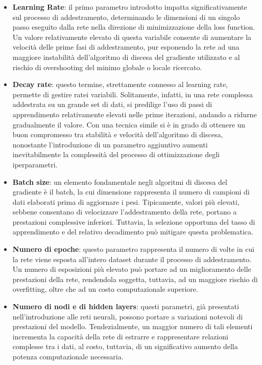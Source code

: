    \begin{itemize}

        \item \textbf{Learning Rate}: il primo parametro introdotto impatta significativamente sul processo di addestramento, determinando le dimensioni di un singolo passo eseguito dalla rete nella direzione di minimizzazione della loss function. Un valore relativamente elevato di questa variabile consente di aumentare la velocità delle prime fasi di addestramento, pur esponendo la rete ad una maggiore instabilità dell'algoritmo di discesa del gradiente utilizzato e al rischio di overshooting del minimo globale o locale ricercato.
        
        \item \textbf{Decay rate}: questo termine, strettamente connesso al learning rate, permette di gestire ratei variabili. Solitamente, infatti, in una rete complessa addestrata su un grande set di dati, si predilige l'uso di passi di apprendimento relativamente elevati nelle prime iterazioni, andando a ridurne gradualmente il valore. Con una tecnica simile si è in grado di ottenere un buon compromesso tra stabilità e velocità dell'algoritmo di discesa, nonostante l'introduzione di un parametro aggiuntivo aumenti inevitabilmente la complessità del processo di ottimizzazione degli iperparametri.
        
        \item \textbf{Batch size}: un elemento fondamentale negli algoritmi di discesa del gradiente è il batch, la cui dimensione rappresenta il numero di campioni di dati elaborati prima di aggiornare i pesi. Tipicamente, valori più elevati, sebbene consentano di velocizzare l'addestramento della rete, portano a prestazioni complessive inferiori. Tuttavia, la selezione opportuna del tasso di apprendimento e del relativo decadimento può mitigare questa problematica. 
        
        \item \textbf{Numero di epoche}: questo parametro rappresenta il numero di volte in cui la rete viene esposta all'intero dataset durante il processo di addestramento. Un numero di esposizioni più elevato può portare ad un miglioramento delle prestazioni della rete, rendendola soggetta, tuttavia, ad un maggiore rischio di overfitting, oltre che ad un costo computazionale superiore. 
        
        \item \textbf{Numero di nodi e di hidden layers}: questi parametri, già presentati nell'introduzione alle reti neurali, possono portare a variazioni notevoli di prestazioni del modello. Tendezialmente, un maggior numero di tali elementi incrementa la capacità della rete di estrarre e rappresentare relazioni complesse tra i dati, al costo, tuttavia, di un significativo aumento della potenza computazionale necessaria. 
        
    \end{itemize}

